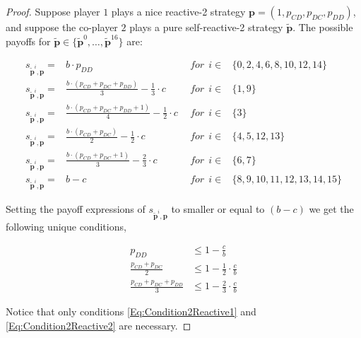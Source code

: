 \documentclass[11pt]{article}
\theoremstyle{plainCl1}
\theoremstyle{plainCl2}
\begin{document}
\begin{proof}
Suppose player $1$ plays a nice reactive-2 strategy $\mathbf{p} = (1, p_{CD},
p_{DC}, p_{DD})$, and suppose the co-player $2$ plays a pure self-reactive-2
strategy $\mathbf{\tilde{p}}$. The possible payoffs for
$\mathbf{\tilde{p}} \in \{\mathbf{\tilde{p}}^{0}, \dots, \mathbf{\tilde{p}}^{16}\}$
are:

\begin{equation*}\label{Eq:PayoffExpressionsReactiveTwo}
  \begin{array}{lclc}
    s_{\mathbf{\tilde{p}}^{i}, \mathbf{p}} = & b \cdot p_{DD} & ~~for~~ i \in & \{0, 2, 4, 6, 8, 10, 12, 14\} \\ [1em]
    s_{\mathbf{\tilde{p}}^{i}, \mathbf{p}} = & \frac{b \cdot (p_{CD} + p_{DC} + p_{DD})}{3} - \frac{1}{3} \cdot c  &  ~~for~~ i \in & \{1, 9\} \\ [1em]
    s_{\mathbf{\tilde{p}}^{i}, \mathbf{p}} = & \frac{b \cdot (p_{CD} + p_{DC} + p_{DD} + 1)}{4} - \frac{1}{2} \cdot c  & ~~for~~ i \in & \{3\} \\ [1em]
    s_{\mathbf{\tilde{p}}^{i}, \mathbf{p}} = & \frac{b \cdot (p_{CD} + p_{DC})}{2} - \frac{1}{2} \cdot c  & ~~for~~ i \in & \{4, 5, 12, 13\} \\ [1em]
    s_{\mathbf{\tilde{p}}^{i}, \mathbf{p}} = & \frac{b \cdot (p_{CD} + p_{DC} + 1)}{3} - \frac{2}{3} \cdot c  &  ~~for~~ i \in & \{6, 7\}\\ [1em]
    s_{\mathbf{\tilde{p}}^{i}, \mathbf{p}} = & b - c  & ~~for~~ i \in & \{8, 9, 10, 11, 12, 13, 14, 15\}
  \end{array}
\end{equation*}

Setting the payoff expressions of $s_{\mathbf{\tilde{p}}^{i}, \mathbf{p}}$ to
smaller or equal to $(b - c)$ we get the following unique conditions,

\begin{align} 
  p_{DD} & \leq 1 - \frac{c}{b} \label{Eq:Condition2Reactive1} \\
  \frac{p_{CD} + p_{DC}}{2} & \leq 1 - \frac{1}{2}  \cdot \frac{c}{b} \label{Eq:Condition2Reactive2} \\
  \frac{p_{CD} + p_{DC} + p_{DD}}{3} & \leq 1 - \frac{2}{3} \cdot \frac{c}{b} \label{Eq:Condition2Reactive3}
\end{align}

Notice that only conditions \eqref{Eq:Condition2Reactive1} and
\eqref{Eq:Condition2Reactive2} are necessary.

\end{proof}
\end{document}
